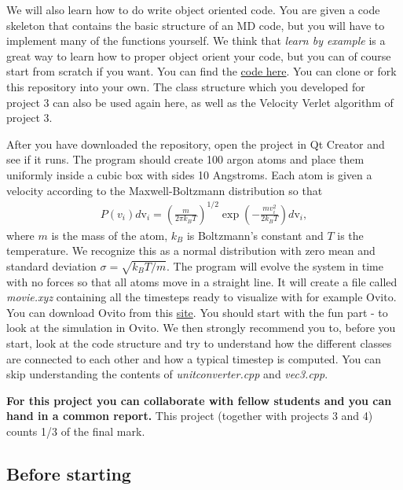 \documentclass[%
oneside,                 %
final,                   %
10pt]{article}
\begin{document}
We will also learn how to do write object oriented code. You are given
a code skeleton that contains the basic structure of an MD code, but
you will have to implement many of the functions yourself. We think
that \emph{learn by example} is a great way to learn how to proper
object orient your code, but you can of course start from scratch if
you want. You can find the \href{{https://github.com/andeplane/molecular-dynamics-fys3150}}{code
here}. You
can clone or fork this repository into your own.  The class structure
which you developed for project 3 can also be used again here, as well
as the Velocity Verlet algorithm of project 3.


After you have downloaded the repository, open the project in Qt
Creator and see if it runs. The program should create 100 argon atoms
and place them uniformly inside a cubic box with sides 10
Angstroms. Each atom is given a velocity according to the
Maxwell-Boltzmann distribution so that
\begin{align} 
P(v_i)d\mathrm{v}_i = \left(\frac{m}{2\pi k_B
T}\right)^{1/2} \exp\left(-\frac{m v_i^2}{2k_B T}\right)d\mathrm{v}_i,
\end{align} 
where $m$ is the mass of the atom, $k_B$ is
Boltzmann's constant and $T$ is the temperature. We recognize this as
a normal distribution with zero mean and standard deviation $\sigma =
\sqrt{k_B T/m}$. The program will evolve the system in time with no
forces so that all atoms move in a straight line. It will create a
file called \emph{movie.xyz} containing all the timesteps ready to
visualize with for example Ovito. You can download Ovito from this \href{{http://www.ovito.org/index.php/download}}{site}. You should start
with the fun part - to look at the simulation in Ovito. We then
strongly recommend you to, before you start, look at the code
structure and try to understand how the different classes are
connected to each other and how a typical timestep is computed. You
can skip understanding the contents of \emph{unitconverter.cpp} and \emph{vec3.cpp}.


\textbf{For this project you can collaborate with fellow students and you can  hand in a common report.}
This project (together with projects 3 and 4) counts 1/3 of the final mark.

\subsection{Before starting}
\end{document}
